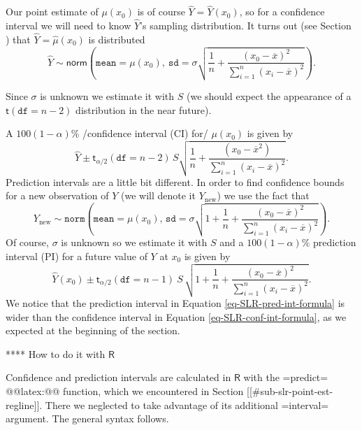 Our point estimate of \(\mu(x_{0})\) is of course
\(\hat{Y}=\hat{Y}(x_{0})\), so for a confidence interval we will need
to know \(\hat{Y}\)'s sampling distribution. It turns out (see Section
) that \(\hat{Y}=\hat{\mu}(x_{0})\) is distributed
\begin{equation}
\hat{Y}\sim\mathsf{norm}\left(\mathtt{mean}=\mu(x_{0}),\:\mathtt{sd}=\sigma\sqrt{\frac{1}{n}+\frac{(x_{0}-\overline{x})^{2}}{\sum_{i=1}^{n}(x_{i}-\overline{x})^{2}}}\right).
\end{equation}

Since \(\sigma\) is unknown we estimate it with \(S\) (we should
expect the appearance of a \(\mathsf{t}(\mathtt{df}=n-2)\)
distribution in the near future).

A \( 100(1-\alpha)\% \) /confidence interval (CI) for/ \(\mu(x_{0})\)
is given by
\begin{equation}
\label{eq-SLR-conf-int-formula}
\hat{Y}\pm\mathsf{t}_{\alpha/2}(\mathtt{df}=n-2)\, S\sqrt{\frac{1}{n}+\frac{(x_{0}-\overline{x}^{2})}{\sum_{i=1}^{n}(x_{i}-\overline{x})^{2}}}.
\end{equation}
Prediction intervals are a little bit different. In order to find
confidence bounds for a new observation of \(Y\) (we will denote it
\(Y_{\mbox{new}}\)) we use the fact that
\begin{equation}
Y_{\mbox{new}}\sim\mathtt{norm}\left(\mathtt{mean}=\mu(x_{0}),\,\mathtt{sd}=\sigma\sqrt{1+\frac{1}{n}+\frac{(x_{0}-\overline{x})^{2}}{\sum_{i=1}^{n}(x_{i}-\overline{x})^{2}}}\right).
\end{equation}
Of course, \(\sigma\) is unknown so we estimate it with \(S\) and a \(
100(1-\alpha)\% \) prediction interval (PI) for a future value of
\(Y\) at \(x_{0}\) is given by
\begin{equation}
\label{eq-SLR-pred-int-formula}
\hat{Y}(x_{0})\pm\mathsf{t}_{\alpha/2}(\mathtt{df}=n-1)\: S\,\sqrt{1+\frac{1}{n}+\frac{(x_{0}-\overline{x})^{2}}{\sum_{i=1}^{n}(x_{i}-\overline{x})^{2}}}.
\end{equation}
We notice that the prediction interval in Equation
\eqref{eq-SLR-pred-int-formula} is wider than the confidence interval
in Equation \eqref{eq-SLR-conf-int-formula}, as we expected at the
beginning of the section.

**** How to do it with \(\mathsf{R}\)

Confidence and prediction intervals are calculated in \(\mathsf{R}\)
with the =predict= @@latex:@@ function, which we
encountered in Section [[#sub-slr-point-est-regline]]. There we neglected to
take advantage of its additional =interval= argument. The general
syntax follows.


